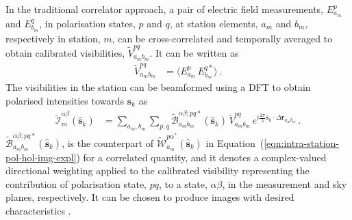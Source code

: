 \documentclass[
  journal=pasa,
  manuscript=article-type,
  year=2020,
  volume=37,
]{cup-journal}
\begin{document}
In the traditional correlator approach, a pair of electric field measurements, $E_{a_m}^p$ and $E_{b_m}^q$, in polarisation states, $p$ and $q$, at station elements, $a_m$ and $b_m$, respectively in station, $m$, can be cross-correlated and temporally averaged to obtain calibrated visibilities, $\widetilde{V}_{a_m b_m}^{pq}$. It can be written as 
\begin{align}
    \widetilde{V}_{a_m b_m}^{pq} &= \bigl\langle E_{a_m}^p \, E_{b_m}^{q*}\bigr\rangle \, . \label{eqn:intra-station-pol-visibilities}
\end{align}
The visibilities in the station can be beamformed using a DFT to obtain polarised intensities towards $\boldsymbol{s}_k$ as
\begin{align}
    \widetilde{\mathcal{I}}_m^{\alpha\beta}(\hat{\boldsymbol{s}}_k) 
    &= \sum_{a_m,b_m} \sum_{p,q} \widetilde{\mathcal{B}}_{a_m b_m}^{\alpha\beta;pq*}(\hat{\boldsymbol{s}}_k) \, \widetilde{V}_{a_m b_m}^{pq} \,  e^{i\frac{2\pi}{\lambda} \hat{\boldsymbol{s}}_k\cdot\Delta\boldsymbol{r}_{a_m b_m}} \, . \label{eqn:intra-station-pol-xbf-img-expl} 
\end{align}
$\widetilde{\mathcal{B}}_{a_m b_m}^{\alpha\beta;pq*}(\hat{\boldsymbol{s}}_k)$, is the counterpart of $\widetilde{\mathcal{W}}_{a_m}^{{p\alpha}^*}(\hat{\boldsymbol{s}}_k)$ in Equation~(\ref{eqn:intra-station-pol-hol-img-expl}) for a correlated quantity, and it denotes a complex-valued directional weighting applied to the calibrated visibility representing the contribution of polarisation state, $pq$, to a state, $\alpha\beta$, in the measurement and sky planes, respectively. It can be chosen to produce images with desired characteristics \citep{Masui+2019}. 
\end{document}
